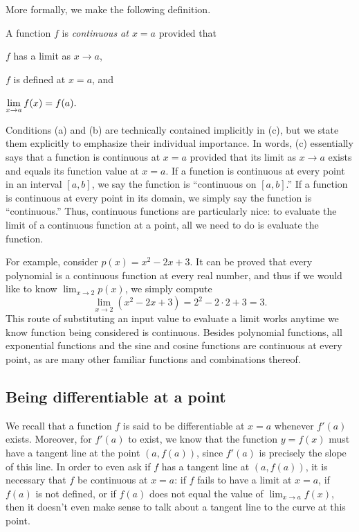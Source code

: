 More formally, we make the following definition.
\begin{definition} 
A function $f$ is \emph{continuous at $x = a$}  provided that
\ba
	\item $f$ has a limit as $x \to a$,
	\item $f$ is defined at $x = a$, and
	\item $\displaystyle \lim_{x \to a} f(x) = f(a).$
\ea
\end{definition}
Conditions (a) and (b) are technically contained implicitly in (c), but we state them explicitly to emphasize their individual importance.  In words, (c) essentially says that a function is continuous at $x = a$ provided that its limit as $x \to a$ exists and equals its function value at $x = a$.  If a function is continuous at every point in an interval $[a,b]$, we say the function is ``continuous on $[a,b]$.''  If a function is continuous at every point in its domain, we simply say the function is ``continuous.'' Thus, continuous functions are particularly nice:  to evaluate the limit of a continuous function at a point, all we need to do is evaluate the function.

For example, consider $p(x) = x^2 - 2x + 3$.  It can be proved that every polynomial is a continuous function at every real number, and thus if we would like to know $\lim_{x \to 2} p(x)$, we simply compute
$$\lim_{x \to 2} (x^2 - 2x + 3) = 2^2 - 2 \cdot 2 + 3 = 3.$$
This route of substituting an input value to evaluate a limit works anytime we know function being considered is continuous.  Besides polynomial functions, all exponential functions and the sine and cosine functions are continuous at every point, as are many other familiar functions and combinations thereof.  



\subsection*{Being differentiable at a point} 

We recall that a function $f$ is said to be differentiable at $x = a$ whenever $f'(a)$ exists.  Moreover, for $f'(a)$ to exist, we know that the function $y = f(x)$ must have a tangent line at the point $(a,f(a))$, since $f'(a)$ is precisely the slope of this line.  In order to even ask if $f$ has a tangent line at $(a,f(a))$, it is necessary that $f$ be continuous at $x = a$: if $f$ fails to have a limit at $x = a$, if $f(a)$ is not defined, or if $f(a)$ does not equal the value of $\lim_{x \to a} f(x)$, then it doesn't even make sense to talk about a tangent line to the curve at this point.


